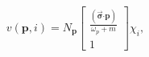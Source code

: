 \begin{equation}
v(\mathbf{p,}i)=N_{\mathbf{p}}\left[ 
\begin{array}{c}
\frac{(\overrightarrow{\mathbf{\sigma }}\mathbf{\cdot p})}{\omega _{p}+m} \\ 
1
\end{array}
\right] \chi _{i},
\end{equation}

